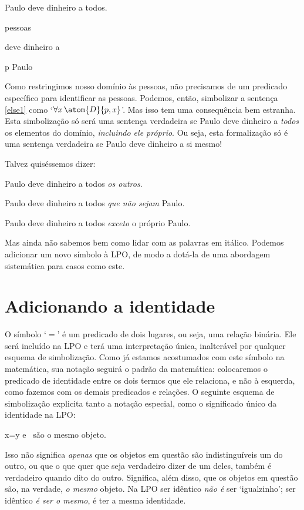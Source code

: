 \begin{earg}
\item[\ex{else1}] Paulo deve dinheiro a todos.
\end{earg}
	\begin{center}
	\begin{ekey}
		\item[\text{domínio}] pessoas
		\item[\atom{D}{x,y}]  deve dinheiro a 
		\item[p] Paulo
	\end{ekey}
	\end{center}
Como restringimos nosso domínio às pessoas, não precisamos de um predicado específico para identificar as pessoas.
Podemos, então, simbolizar a sentença \ref{else1} como `$\forall x\, \atom{D}{p,x}$'.
Mas isso tem uma consequência bem estranha.
Esta simbolização só será uma sentença verdadeira se Paulo deve dinheiro a \emph{todos} os elementos do domínio, \emph{incluindo ele próprio}.
Ou seja, esta formalização só é uma sentença verdadeira se Paulo deve dinheiro a si mesmo!

Talvez quiséssemos dizer:
	\begin{earg}
		\item[\ex{else1b}] Paulo deve dinheiro a todos \emph{os outros}.
		\item[\ex{else1c}] Paulo deve dinheiro a todos \emph{que não sejam} Paulo.
		\item[\ex{else1d}] Paulo deve dinheiro a todos  \emph{exceto} o próprio Paulo.
	\end{earg}
Mas ainda não sabemos bem como lidar com as palavras em itálico.
Podemos adicionar um novo símbolo à LPO, de modo a dotá-la de uma abordagem sistemática para casos como este.


\section{Adicionando a identidade}
O símbolo `$=$' é um predicado de dois lugares, ou seja, uma relação binária.
Ele será incluído na LPO e terá uma interpretação única, inalterável por qualquer esquema de simbolização.
Como já estamos acostumados com este símbolo na matemática, sua notação seguirá o padrão da matemática:
colocaremos o predicado de identidade entre os dois termos que ele relaciona, e não à esquerda, como fazemos com os demais predicados e relações.
O seguinte esquema de simbolização explicita tanto a notação especial, como o significado único da identidade na LPO:
	\begin{ekey}
		\item[x=y]  e \ são o mesmo objeto. 
	\end{ekey}
Isso não significa \emph{apenas} que os objetos em questão são indistinguíveis um do outro, ou que o que quer que seja verdadeiro dizer de um deles, também é verdadeiro quando dito do outro.
Significa, além disso, que os objetos em questão são, na verdade, \emph{o mesmo} objeto.
Na LPO ser idêntico \emph{não é} ser `igualzinho'; ser idêntico \emph{é ser o mesmo}, é ter a mesma identidade.

